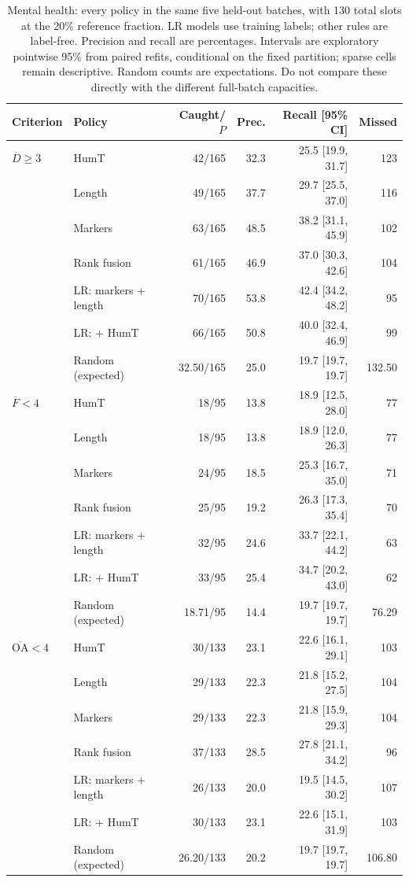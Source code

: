\begin{table}[htbp]
\centering\small
\caption{Mental health: every policy in the same five held-out batches, with 130 total slots at the 20\% reference fraction. LR models use training labels; other rules are label-free. Precision and recall are percentages. Intervals are exploratory pointwise 95\% from paired refits, conditional on the fixed partition; sparse cells remain descriptive. Random counts are expectations. Do not compare these directly with the different full-batch capacities.}
\label{tab:held_mental_health}
\begin{tabular}{llrrrr}
\toprule
Criterion & Policy & Caught/$P$ & Prec. & Recall [95\% CI] & Missed \\
\midrule
$\overline D\geq3$ & HumT & 42/165 & 32.3 & 25.5 [19.9, 31.7] & 123 \\
 & Length & 49/165 & 37.7 & 29.7 [25.5, 37.0] & 116 \\
 & Markers & 63/165 & 48.5 & 38.2 [31.1, 45.9] & 102 \\
 & Rank fusion & 61/165 & 46.9 & 37.0 [30.3, 42.6] & 104 \\
 & LR: markers + length & 70/165 & 53.8 & 42.4 [34.2, 48.2] & 95 \\
 & LR: + HumT & 66/165 & 50.8 & 40.0 [32.4, 46.9] & 99 \\
 & Random (expected) & 32.50/165 & 25.0 & 19.7 [19.7, 19.7] & 132.50 \\
$\overline F<4$ & HumT & 18/95 & 13.8 & 18.9 [12.5, 28.0] & 77 \\
 & Length & 18/95 & 13.8 & 18.9 [12.0, 26.3] & 77 \\
 & Markers & 24/95 & 18.5 & 25.3 [16.7, 35.0] & 71 \\
 & Rank fusion & 25/95 & 19.2 & 26.3 [17.3, 35.4] & 70 \\
 & LR: markers + length & 32/95 & 24.6 & 33.7 [22.1, 44.2] & 63 \\
 & LR: + HumT & 33/95 & 25.4 & 34.7 [20.2, 43.0] & 62 \\
 & Random (expected) & 18.71/95 & 14.4 & 19.7 [19.7, 19.7] & 76.29 \\
$\overline{\mathrm{OA}}<4$ & HumT & 30/133 & 23.1 & 22.6 [16.1, 29.1] & 103 \\
 & Length & 29/133 & 22.3 & 21.8 [15.2, 27.5] & 104 \\
 & Markers & 29/133 & 22.3 & 21.8 [15.9, 29.3] & 104 \\
 & Rank fusion & 37/133 & 28.5 & 27.8 [21.1, 34.2] & 96 \\
 & LR: markers + length & 26/133 & 20.0 & 19.5 [14.5, 30.2] & 107 \\
 & LR: + HumT & 30/133 & 23.1 & 22.6 [15.1, 31.9] & 103 \\
 & Random (expected) & 26.20/133 & 20.2 & 19.7 [19.7, 19.7] & 106.80 \\
\bottomrule
\end{tabular}
\end{table}
